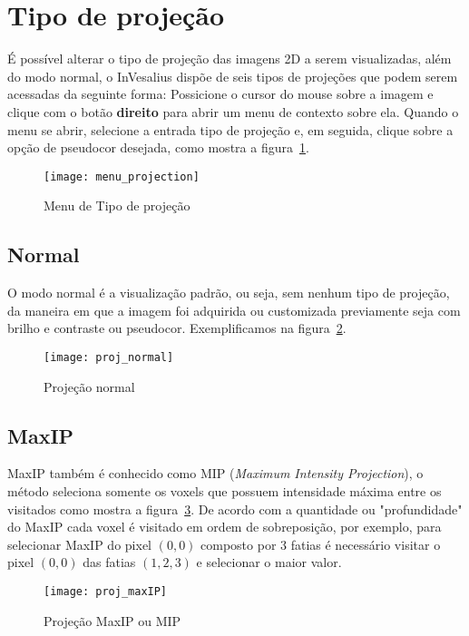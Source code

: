 \newpage

\section{Tipo de projeção}

É possível alterar o tipo de projeção das imagens 2D a serem visualizadas, além do modo normal, o InVesalius dispõe de seis tipos de projeções que podem serem acessadas da seguinte forma: Possicione o cursor do mouse sobre a imagem e clique com o botão \textbf{direito} para abrir um menu de contexto sobre ela. Quando o menu se abrir, selecione a entrada tipo de projeção e, em seguida, clique sobre a opção de pseudocor desejada, como mostra a figura~\ref{fig:menu_proj}.

\begin{figure}[H]
\centering
\texttt{[image: menu\_projection]}
\caption{Menu de Tipo de projeção}
\label{fig:menu_proj}
\end{figure}

\subsection{Normal}

O modo normal é a visualização padrão, ou seja, sem nenhum tipo de projeção, da maneira em que a imagem foi adquirida ou customizada previamente seja com brilho e contraste ou pseudocor. Exemplificamos na figura~\ref{fig:proj_normal}.

\begin{figure}[H]
\centering
\texttt{[image: proj\_normal]}
\caption{Projeção normal}
\label{fig:proj_normal}
\end{figure}

\subsection{MaxIP}
\label{sec:max_ip}
MaxIP também é conhecido como MIP (\textit{Maximum Intensity Projection}), o método seleciona somente os voxels que possuem intensidade máxima entre os visitados como mostra a figura~\ref{fig:proj_maxip}. De acordo com a quantidade ou "profundidade" do MaxIP cada voxel é visitado em ordem de sobreposição, por exemplo, para selecionar MaxIP do pixel $(0,0)$ composto por 3 fatias é necessário visitar o pixel $(0,0)$ das fatias $(1,2,3)$ e selecionar o maior valor.

\begin{figure}[H]
\centering
\texttt{[image: proj\_maxIP]}
\caption{Projeção MaxIP ou MIP}
\label{fig:proj_maxip}
\end{figure}


